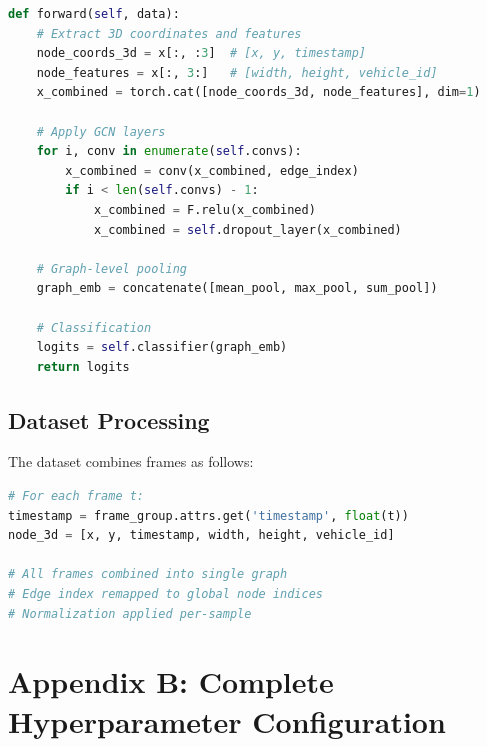 \documentclass[11pt,a4paper]{article}
\begin{document}
\begin{lstlisting}[language=Python, caption=Model Forward Pass Structure]
def forward(self, data):
    # Extract 3D coordinates and features
    node_coords_3d = x[:, :3]  # [x, y, timestamp]
    node_features = x[:, 3:]   # [width, height, vehicle_id]
    x_combined = torch.cat([node_coords_3d, node_features], dim=1)
    
    # Apply GCN layers
    for i, conv in enumerate(self.convs):
        x_combined = conv(x_combined, edge_index)
        if i < len(self.convs) - 1:
            x_combined = F.relu(x_combined)
            x_combined = self.dropout_layer(x_combined)
    
    # Graph-level pooling
    graph_emb = concatenate([mean_pool, max_pool, sum_pool])
    
    # Classification
    logits = self.classifier(graph_emb)
    return logits
\end{lstlisting}

\subsection*{Dataset Processing}

The dataset combines frames as follows:

\begin{lstlisting}[language=Python, caption=Frame Combination Process]
# For each frame t:
timestamp = frame_group.attrs.get('timestamp', float(t))
node_3d = [x, y, timestamp, width, height, vehicle_id]

# All frames combined into single graph
# Edge index remapped to global node indices
# Normalization applied per-sample
\end{lstlisting}

\section*{Appendix B: Complete Hyperparameter Configuration}
\end{document}
